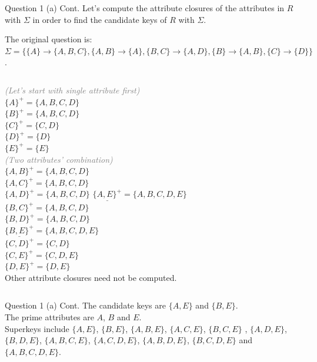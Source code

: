 \begin{frame}[fragile]{Question 1 (a) Cont.}
Let's compute the attribute closures of the attributes in $R$ with $\Sigma$ in order to find the candidate keys of $R$ with $\Sigma$. \vspace{15pt}

The original question is:\\ $\Sigma=\{\{A\} \rightarrow \{A, B, C\}, \{A, B\} \rightarrow \{A\}, \{B, C\} \rightarrow \{A, D\}, \{B\} \rightarrow \{A, B\}, \{C\} \rightarrow \{D\}\}$.\\\vspace{5pt} 

\begin{columns}[t]
	\textcolor{gray}{\scriptsize \textit{(Let's start with single attribute first)}}\\
	$\{A\}^{+}= \{A, B, C, D\}$\\	
	$\{B\}^{+}= \{A, B, C, D\}$\\	
	$\{C\}^{+}= \{C, D\}$\\
	$\{D\}^{+}= \{D\}$\\
	$\{E\}^{+}= \{E\}$\\ \vspace{5pt}
	\textcolor{gray}{\textit{\scriptsize (Two attributes' combination)}}\\
	$\{A, B\}^{+}= \{A, B, C, D\}$\\
	$\{A, C\}^{+}= \{A, B, C, D\}$\\
	$\{A, D\}^{+}= \{A, B, C, D\}$
	$\underline{\{A, E\}^{+}}= \{A, B, C, D, E\}$\\
	$\{B, C\}^{+}= \{A, B, C, D\}$\\
	$\{B, D\}^{+}= \{A, B, C, D\}$\\
	$\underline{\{B, E\}^{+}}= \{A, B, C, D, E\}$\\
	$\{C, D\}^{+}= \{C, D\}$\\
	$\{C, E\}^{+}= \{C, D, E\}$\\
	$\{D, E\}^{+}= \{D, E\}$\\ \vspace{5pt}
	Other attribute closures need not be computed.
\end{columns}
\end{frame}

\begin{frame}[fragile]{Question 1 (a) Cont.}
	The candidate keys are $\{A, E\}$ and $\{B, E\}$. \\\vspace{10pt}
	The prime attributes are $A$, $B$ and $E$.\\ \vspace{10pt}
	Superkeys include  $\{A, E\}$, $\{B, E\}$, $\{A, B, E\}$, $\{A, C, E\}$, $\{B, C, E\}$ , $\{A, D, E\}$, $\{B, D, E\}$, $\{A, B, C, E\}$, $\{A, C, D, E\}$, $\{A, B, D, E\}$, $\{B, C, D, E\}$ and $\{A, B, C, D, E\}$.\\ \vspace{15pt}
\end{frame}

